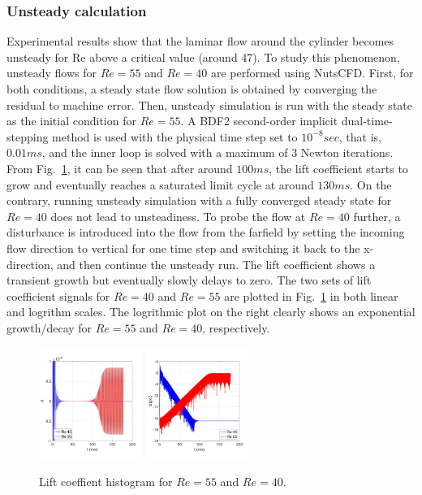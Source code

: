 \documentclass[journal,final]{new-aiaa}
\begin{document}
\subsubsection{Unsteady calculation}
Experimental results show that the laminar flow around the cylinder
becomes unsteady for Re above a critical value (around 47)\cite{Williamson2003Vortex}. To study
this phenomenon, unsteady flows for $Re=55$ and $Re=40$
are performed using NutsCFD. First, for both conditions, a steady
state flow solution is obtained by converging the residual to machine error.
Then, unsteady simulation is run with the steady state
as the initial condition for $Re=55$.
A BDF2 second-order implicit dual-time-stepping
method is used with the physical time step set to
$10^{-8} sec$, that is, $0.01 ms$, and
the inner loop is solved with a maximum of 3 Newton iterations.
From Fig.~\ref{fig:cyl-re40-re55-uns}, it can be seen
that after around $100 ms$, the lift coefficient starts to grow and
eventually reaches a saturated limit cycle at around $130 ms$.
On the contrary, running unsteady simulation with a fully converged
steady state for $Re=40$ does not lead to unsteadiness. To probe
the flow at $Re=40$ further, a disturbance is introduced into the
flow from the farfield by setting the incoming flow direction to vertical
for one time step and switching it back to the x-direction,
and then continue the unsteady run. The lift coefficient shows a
transient growth but eventually slowly delays to zero. The
two sets of lift coefficient signals for $Re=40$ and $Re=55$
are plotted in Fig.~\ref{fig:cyl-re40-re55-uns}
in both linear and logrithm scales. The logrithmic plot on the right
clearly shows an exponential growth/decay for $Re=55$ and $Re=40$,
respectively.

\begin{figure}[htb]
	\centering   
	\includegraphics[width=0.3\textwidth]{pic/cl-linear.jpg}	
	\includegraphics[width=0.3\textwidth]{pic/cl-log.jpg}
	\caption{Lift coeffient histogram for $Re=55$ and $Re=40$.}
	\label{fig:cyl-re40-re55-uns}
\end{figure}
\end{document}
